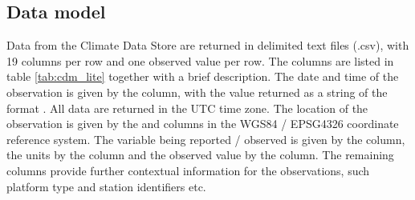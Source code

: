 \FloatBarrier
\subsection{Data model}
Data from the Climate Data Store are returned in delimited text files (.csv), with 19 columns per row and one observed value per row. 
The columns are listed in table \ref{tab:cdm_lite} together with a brief description.  
The date and time of the observation is given by the  column, with the value returned as a string of the format . 
All data are returned in the UTC time zone.
The location of the observation is given by the  and  columns in the WGS84 / EPSG4326 coordinate reference system. 
The variable being reported / observed is given by the  column, the units by the  column and the observed value by the  column. 
The remaining columns provide further contextual information for the observations, such platform type and station identifiers etc. 

